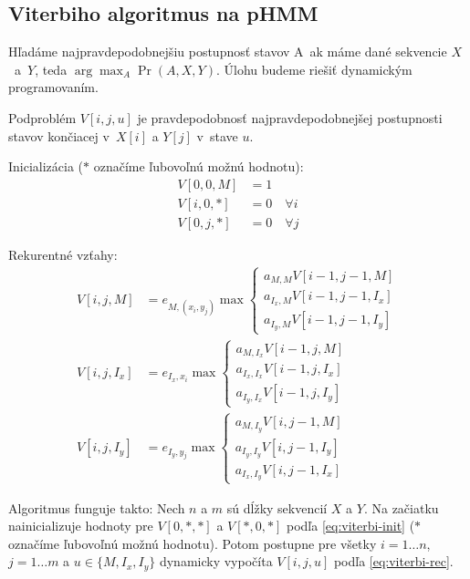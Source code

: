 \subsection{Viterbiho algoritmus na pHMM}
Hľadáme najpravdepodobnejšiu postupnosť stavov A~ak máme dané sekvencie $X$~a~$Y$, teda $\arg\max_A \Pr(A, X, Y)$. Úlohu budeme riešiť dynamickým programovaním.

Podproblém $V[i, j, u]$ je pravdepodobnosť najpravdepodobnejšej postupnosti stavov končiacej v~$X[i]$ a $Y[j]$ v~stave $u$.

Inicializácia ($*$ označíme ľubovoľnú možnú hodnotu):
\begin{subequations}
\label{eq:viterbi-init}
\begin{align}
V[0,0,M] &= 1 \\
V[i,0,*] &= 0 \quad \forall i\\
V[0,j,*] &= 0 \quad \forall j
\end{align}
\end{subequations}

Rekurentné vzťahy:
\begin{subequations}
\label{eq:viterbi-rec}
\begin{align}
\label{eq:viterbi-recM}
V[i,j,M] &= e_{M, (x_i, y_j)} \max \left\{
\begin{array}{l}
a_{M,M} V[i-1,j-1,M]\\
a_{I_x,M} V[i-1,j-1,I_x]\\
a_{I_y,M} V[i-1,j-1, I_y]
\end{array} \right.\\
\label{eq:viterbi-recX}
V[i,j, I_x] &= e_{I_x, x_i}\max \left\{
\begin{array}{l}
a_{M, I_x} V[i-1,j,M]\\
a_{I_x, I_x} V[i-1,j,I_x]\\
a_{I_y, I_x} V[i-1,j,I_y]
\end{array} \right.\\
\label{eq:viterbi-recY}
V[i,j, I_y] &= e_{I_y, y_j}\max \left\{
\begin{array}{l}
a_{M, I_y} V[i,j-1,M]\\
a_{I_y, I_y} V[i,j-1,I_y]\\
a_{I_x, I_y} V[i,j-1,I_x]
\end{array} \right.
\end{align}
\end{subequations}

Algoritmus funguje takto:
Nech $n$ a $m$ sú dĺžky sekvencií $X$ a $Y$.
Na začiatku nainicializuje hodnoty pre $V[0,*,*]$ a $V[*,0,*]$ podľa \ref{eq:viterbi-init} ($*$ označíme ľubovoľnú možnú hodnotu).
Potom postupne pre všetky $i = 1\dots n$, $j = 1\dots m$ a $u \in \{M, I_x, I_y\}$ dynamicky vypočíta $V[i, j, u]$ podľa \ref{eq:viterbi-rec}.


